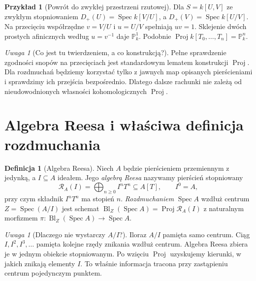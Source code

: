 \documentclass[11pt,a4paper,openany]{report}
\numberwithin{equation}{section}
\theoremstyle{plain}
\theoremstyle{definition}
\newtheorem{definicja}[twierdzenie]{Definicja}
\newtheorem{przyklad}[twierdzenie]{Przykład}
\theoremstyle{remark}
\newtheorem{uwaga}[twierdzenie]{Uwaga}
\newcommand{\PP}{\mathbb P}
\newcommand{\Spec}{\operatorname{Spec}}
\begin{document}
\begin{przyklad}[Powrót do zwykłej przestrzeni rzutowej]
Dla $S=k[U,V]$ ze zwykłym stopniowaniem
$D_+(U)=\Spec k[V/U]$, a $D_+(V)=\Spec k[U/V]$.
Na przecięciu współrzędne $v=V/U$ i $u=U/V$
spełniają $uv=1$. Sklejenie dwóch prostych afinicznych
według $u=v^{-1}$ daje $\PP^1_k$.
Podobnie $\operatorname{Proj}k[T_0,\ldots,T_n]=\PP^n_k$.
\end{przyklad}

\begin{uwaga}[Co jest tu twierdzeniem, a co konstrukcją?]
Pełne sprawdzenie zgodności snopów na przecięciach jest
standardowym lematem konstrukcji $\operatorname{Proj}$.
Dla rozdmuchań będziemy korzystać tylko z jawnych map
opisanych pierścieniami i sprawdzimy ich przejścia bezpośrednio.
Dlatego dalsze rachunki nie zależą od nieudowodnionych
własności kohomologicznych $\operatorname{Proj}$.
\end{uwaga}

\section{Algebra Reesa i właściwa definicja rozdmuchania}
\label{sec:ga5-rees}

\begin{definicja}[Algebra Reesa]
\label{def:ga5-rees}
Niech $A$ będzie pierścieniem przemiennym z jedynką,
a $I\subseteq A$ ideałem. Jego \emph{algebrą Reesa}
nazywamy pierścień stopniowany
\[
 \mathcal R_A(I)=\bigoplus_{n\ge0}I^nT^n\subseteq A[T],
 \qquad I^0=A,
\]
przy czym składnik $I^nT^n$ ma stopień $n$.
\emph{Rozdmuchaniem} $\Spec A$ wzdłuż centrum
$Z=\Spec(A/I)$ jest schemat
$\operatorname{Bl}_Z(\Spec A)=\operatorname{Proj}\mathcal R_A(I)$
z naturalnym morfizmem $\pi:\operatorname{Bl}_Z(\Spec A)\to\Spec A$.
\end{definicja}

\begin{uwaga}[Dlaczego nie wystarczy $A/I$?]
Iloraz $A/I$ pamięta samo centrum. Ciąg
$I,I^2,I^3,\ldots$ pamięta kolejne rzędy znikania
wzdłuż centrum. Algebra Reesa zbiera je w jednym
obiekcie stopniowanym. Po wzięciu $\operatorname{Proj}$
uzyskujemy kierunki, w jakich znikają elementy $I$.
To właśnie informacja tracona przy zastąpieniu
centrum pojedynczym punktem.
\end{uwaga}
\end{document}
